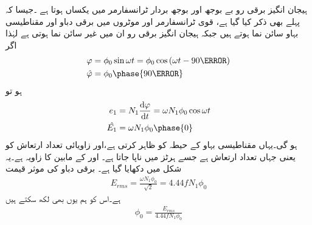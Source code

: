 ہیجان انگیز برقی رو بے بوجھ اور بوجھ بردار ٹرانسفارمر میں یکساں ہوتا ہے ۔جیسا کہ پہلے بھی ذکر کیا گیا ہے، قوی ٹرانسفارمر اور موٹروں میں برقی دباو اور مقناطیسی بہاو سائن نما ہوتے ہیں جبکہ ہیجان انگیز برقی رو ان میں غیر سائن نما ہوتی ہے لہٰذا اگر
\begin{gather}
\begin{aligned}
\varphi&=\phi_0 \sin \omega t=\phi_0 \cos \left(\omega t -90\degree \right)\\
\hat{\varphi}&=\phi_0 \phase{90\degree}
\end{aligned}
\end{gather}
ہو تو
\begin{gather}
\begin{aligned}\label{مساوات_ٹڑانسفارمر_دباو_سمتیہ}
e_1&=N_1 \frac{\dif \varphi}{\dif t}=\omega N_1 \phi_0 \cos \omega t\\
\hat{E_1}&=\omega N_1 \phi_0 \phase{0}
\end{aligned}
\end{gather}
ہو گی۔یہاں  مقناطیسی بہاو کے حیطہ کو ظاہر کرتی ہے،اور  زاویائی تعداد ارتعاش کو یعنی  جہاں  تعداد ارتعاش ہے جسے ہرٹز  میں ناپا جاتا ہے۔ اور  کے مابین  کا زاویہ ہے۔یہ شکل  میں دکھایا گیا ہے۔ برقی دباو  کی موثر قیمت   
\begin{align}
E_{rms}=\frac{\omega N_1 \phi_0}{\sqrt{2}}=4.44 f N_1 \phi_0
\end{align}
ہے۔اس کو ہم یوں بھی لکھ سکتے ہیں
\begin{align}\label{مساوات_ٹرانسفارمر_درکار_ہیجان_بہاو}
\phi_0=\frac{E_{rms}}{4.44 f N_1 \phi_0}
\end{align}

